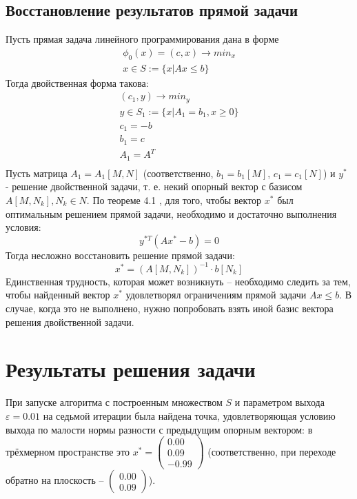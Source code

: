 \documentclass[main.tex]{subfiles}
\begin{document}
\subsection{Восстановление результатов прямой задачи} \label{section:restore}
Пусть прямая задача линейного программирования дана в форме
\begin{gather*}
\phi_0(x) = (c, x) \rightarrow min_{x} \\
x \in S := \{x|Ax \le b\} 
\end{gather*}
Тогда двойственная форма такова:
\begin{gather*}
(c_1, y) \rightarrow min_{y} \\
y \in S_1 := \{x|A_1 = b_1, x \ge 0\}\\
c_1 = -b\\
b_1 = c\\
A_1 = A^T\\
\end{gather*}
Пусть матрица $A_1=A_1[M,N]$ (соответственно, $b_1 = b_1[M]$, $c_1 = c_1[N]$) и $y^*$ - решение двойственной задачи, т. е. некий опорный вектор с базисом $A[M, N_k], N_k \in N$.
По теореме 4.1 \cite{petuh}, для того, чтобы вектор $x^*$ был оптимальным решением прямой задачи, необходимо и достаточно выполнения условия:
$$y^{*T}(Ax^*-b) = 0$$
Тогда несложно восстановить решение прямой задачи:\\
$$ x^* = (A[M, N_k])^{-1} \cdot b[N_k]$$
Единственная трудность, которая может возникнуть -- необходимо следить за тем, чтобы найденный вектор $x^*$ удовлетворял ограничениям прямой задачи $Ax\le b$. В случае, когда это не выполнено, нужно попробовать взять иной базис вектора решения двойственной задачи.
\section{Результаты решения задачи}
При запуске алгоритма с построенным множеством $S$ и параметром выхода $\varepsilon = 0.01$ на седьмой итерации была найдена точка, удовлетворяющая условию выхода по малости нормы разности с предыдущим опорным вектором: в трёхмерном пространстве это $x^* = \begin{pmatrix}0.00 \\0.09 \\ -0.99\end{pmatrix}$ (соответственно, при переходе обратно на плоскость -- $\begin{pmatrix}0.00\\0.09 \end{pmatrix}$). \\
\end{document}
